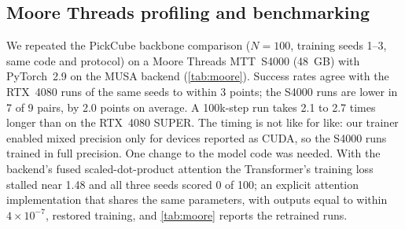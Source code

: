 \subsection{Moore Threads profiling and benchmarking}
\label{sec:moore}

We repeated the PickCube backbone comparison ($N=100$, training seeds 1--3,
same code and protocol) on a Moore Threads MTT~S4000 (48~GB) with PyTorch~2.9
on the MUSA backend (\cref{tab:moore}). Success rates agree with the RTX~4080
runs of the same seeds to within 3 points; the S4000 runs are lower in 7 of 9
pairs, by 2.0 points on average. A 100k-step run takes 2.1 to
2.7 times longer than on the RTX~4080 SUPER. The timing is not like for like:
our trainer enabled mixed precision only for devices reported as CUDA, so the
S4000 runs trained in full precision. One change to the model code was needed.
With the backend's fused scaled-dot-product attention the Transformer's
training loss stalled near 1.48 and all three seeds scored 0 of 100; an
explicit attention implementation that shares the same parameters, with
outputs equal to within $4\times10^{-7}$, restored training, and
\cref{tab:moore} reports the retrained runs.
\FloatBarrier
